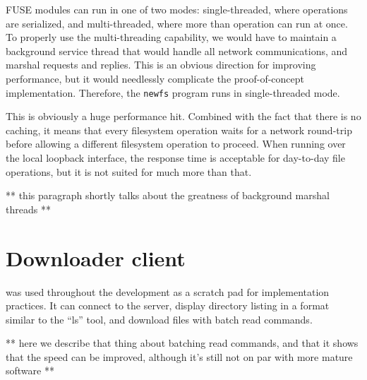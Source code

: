 FUSE modules can run in one of two modes: single-threaded, where operations are serialized, and
multi-threaded, where more than operation can run at once. To properly use the multi-threading capability, we
would have to maintain a background service thread that would handle all network communications, and marshal
requests and replies. This is an obvious direction for improving performance, but it would needlessly
complicate the proof-of-concept implementation. Therefore, the {\tt newfs} program runs in single-threaded
mode.

This is obviously a huge performance hit. Combined with the fact that there is no caching, it means that every
filesystem operation waits for a network round-trip before allowing a different filesystem operation to
proceed. When running over the local loopback interface, the response time is acceptable for day-to-day file
operations, but it is not suited for much more than that.

** this paragraph shortly talks about the greatness of background marshal threads **

\section{Downloader client}

was used throughout the development as a scratch pad for
implementation practices. It can connect to the server, display directory listing in a format similar to the
``ls'' tool, and download files with batch read commands.

** here we describe that thing about batching read commands, and that it shows that the speed can be improved,
although it's still not on par with more mature software **

